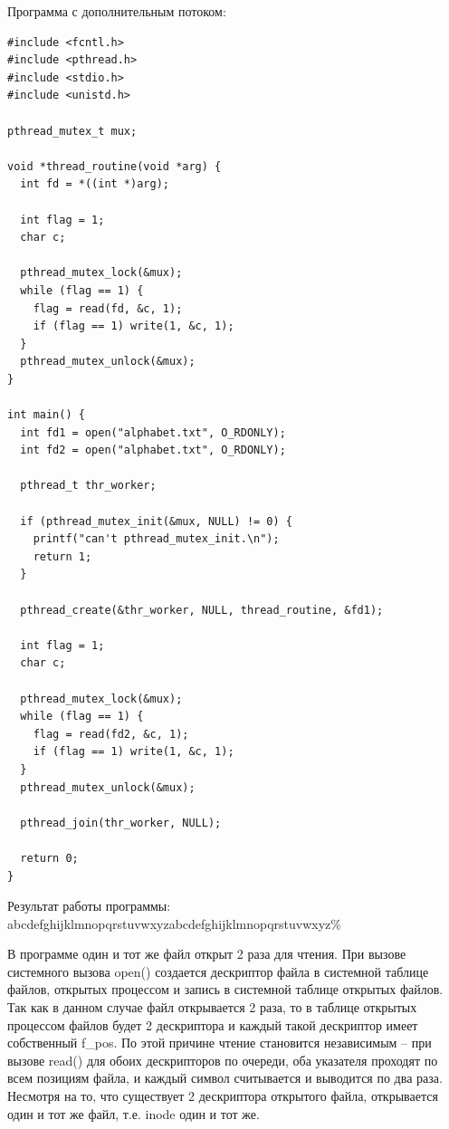 Программа с дополнительным потоком:
\begin{lstlisting}
#include <fcntl.h>
#include <pthread.h>
#include <stdio.h>
#include <unistd.h>

pthread_mutex_t mux;

void *thread_routine(void *arg) {
  int fd = *((int *)arg);
  
  int flag = 1;
  char c;
  
  pthread_mutex_lock(&mux);
  while (flag == 1) {
    flag = read(fd, &c, 1);
    if (flag == 1) write(1, &c, 1);
  }
  pthread_mutex_unlock(&mux);
}

int main() {
  int fd1 = open("alphabet.txt", O_RDONLY);
  int fd2 = open("alphabet.txt", O_RDONLY);
  
  pthread_t thr_worker;
  
  if (pthread_mutex_init(&mux, NULL) != 0) {
    printf("can't pthread_mutex_init.\n");
    return 1;
  }
  
  pthread_create(&thr_worker, NULL, thread_routine, &fd1);
  
  int flag = 1;
  char c;
  
  pthread_mutex_lock(&mux);
  while (flag == 1) {
    flag = read(fd2, &c, 1);
    if (flag == 1) write(1, &c, 1);
  }
  pthread_mutex_unlock(&mux);
  
  pthread_join(thr_worker, NULL);
  
  return 0;
}
\end{lstlisting}
Результат работы программы:
abcdefghijklmnopqrstuvwxyzabcdefghijklmnopqrstuvwxyz\%

В программе один и тот же файл открыт 2 раза для чтения.  При вызове системного
вызова open() создается дескриптор файла в системной таблице файлов, открытых
процессом и запись в системной таблице открытых  файлов.  Так как в данном
случае файл открывается 2 раза, то в таблице открытых процессом файлов будет 2
дескриптора и каждый такой дескриптор имеет собственный f\_pos. По этой причине
чтение становится независимым --  при вызове read() для обоих дескрипторов по
очереди, оба указателя проходят по всем позициям файла, и каждый символ
считывается и выводится по два раза.
Несмотря на то, что существует 2 дескриптора открытого файла, открывается один
и тот же файл, т.е. inode один и тот же.

